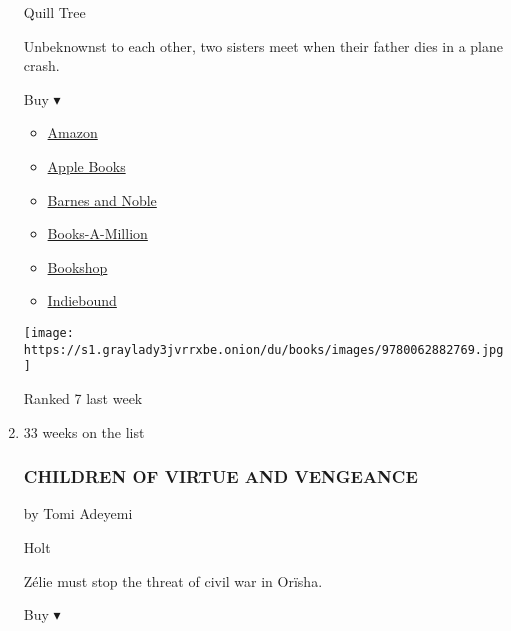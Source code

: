 \begin{enumerate}
  Quill Tree

  Unbeknownst to each other, two sisters meet when their father dies in
  a plane crash.

  Buy ▾

  \begin{itemize}
  \tightlist
  \item
    \href{https://www.amazon.com/dp/0062882767?tag=NYTBSREV-20\&tag=NYTBS-20}{Amazon}
  \item
    \href{https://du-gae-books-dot-nyt-du-prd.appspot.com/buy?title=CLAP+WHEN+YOU+LAND\&author=Elizabeth+Acevedo}{Apple
    Books}
  \item
    \href{https://www.anrdoezrs.net/click-7990613-11819508?url=https\%3A\%2F\%2Fwww.barnesandnoble.com\%2Fw\%2F\%3Fean\%3D9780062882769}{Barnes
    and Noble}
  \item
    \href{https://www.anrdoezrs.net/click-7990613-35140?url=https\%3A\%2F\%2Fwww.booksamillion.com\%2Fp\%2FCLAP\%2BWHEN\%2BYOU\%2BLAND\%2FElizabeth\%2BAcevedo\%2F9780062882769}{Books-A-Million}
  \item
    \href{https://bookshop.org/a/3546/9780062882769}{Bookshop}
  \item
    \href{https://www.indiebound.org/book/9780062882769?aff=NYT}{Indiebound}
  \end{itemize}

  \texttt{[image: https://s1.graylady3jvrrxbe.onion/du/books/images/9780062882769.jpg]}

  Ranked 7 last week
\item
  33 weeks on the list

  \hypertarget{children-of-virtue-and-vengeance}{%
  \subsubsection{CHILDREN OF VIRTUE AND
  VENGEANCE}\label{children-of-virtue-and-vengeance}}

  by Tomi Adeyemi

  Holt

  Zélie must stop the threat of civil war in Orïsha.

  Buy ▾


\end{enumerate}
